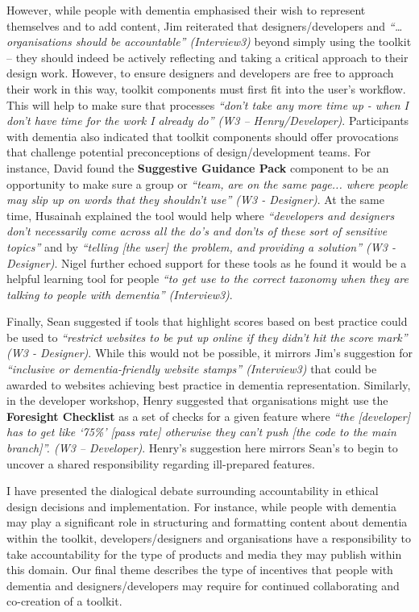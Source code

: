 However, while people with dementia emphasised their wish to represent themselves and to add content, Jim reiterated that designers/developers and \textit{``… organisations should be accountable'' (Interview3)} beyond simply using the toolkit – they should indeed be actively reflecting and taking a critical approach to their design work. However, to ensure designers and developers are free to approach their work in this way, toolkit components must first fit into the user's workflow. This will help to make sure that processes \textit{``don't take any more time up - when I don't have time for the work I already do'' (W3 – Henry/Developer)}. Participants with dementia also indicated that toolkit components should offer provocations that challenge potential preconceptions of design/development teams. For instance, David found the \textbf{Suggestive Guidance Pack }component to be an opportunity to make sure a group or \textit{``team, are on the same page... where people may slip up on words that they shouldn't use'' (W3 - Designer)}. At the same time, Husainah explained the tool would help where \textit{``developers and designers don't necessarily come across all the do's and don'ts of these sort of sensitive topics''} and by \textit{``telling [the user] the problem, and providing a solution'' (W3 - Designer)}. Nigel further echoed support for these tools as he found it would be a helpful learning tool for people \textit{``to get use to the correct taxonomy when they are talking to people with dementia'' (Interview3)}. 

Finally, Sean suggested if tools that highlight scores based on best practice could be used to \textit{``restrict websites to be put up online if they didn't hit the score mark'' (W3 - Designer)}. While this would not be possible, it mirrors Jim's suggestion for \textit{``inclusive or dementia-friendly website stamps'' (Interview3)} that could be awarded to websites achieving best practice in dementia representation. Similarly, in the developer workshop, Henry suggested that organisations might use the \textbf{Foresight Checklist} as a set of checks for a given feature where\textit{ ``the [developer] has to get like ‘75\%’ [pass rate] otherwise they can’t push [the code to the main branch]''. (W3 – Developer)}. Henry’s suggestion here mirrors Sean’s to begin to uncover a shared responsibility regarding ill-prepared features.

I have presented the dialogical debate surrounding accountability in ethical design decisions and implementation. For instance, while people with dementia may play a significant role in structuring and formatting content about dementia within the toolkit, developers/designers and organisations have a responsibility to take accountability for the type of products and media they may publish within this domain. Our final theme describes the type of incentives that people with dementia and designers/developers may require for continued collaborating and co-creation of a toolkit.

